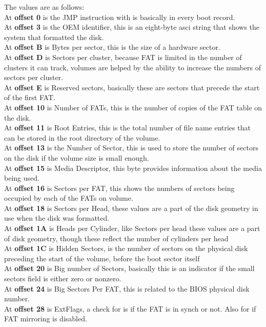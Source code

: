 \documentclass[12ptletterpaper]{paper}
\begin{document}
\begin{flushleft}
		
		The values are as follows:\\
		At \textbf{offset 0} is the JMP instruction with is basically in every boot record.\\
		At \textbf{offset 3} is the OEM identifier, this is an eight-byte asci string that shows the system that formatted the disk.\\
		At \textbf{offset B} is Bytes per sector, this is the size of a hardware sector.\\
		At \textbf{offset D} is Sectors per cluster, because FAT is limited in the number of clusters it can track, volumes are helped by the ability to increase the numbers of sectors per cluster.\\
		At \textbf{offset E} is Reserved sectors, basically these are sectors that precede the start of the first FAT.\\
		At \textbf{offset 10} is Number of FATs, this is the number of copies of the FAT table on the disk.\\
		At \textbf{offset 11} is Root Entries, this is the total number of file name entries that can be stored in the root directory of the volume.\\
		At \textbf{offset 13} is the Number of Sector, this is used to store the number of sectors on the disk if the volume size is small enough.\\
		At \textbf{offset 15} is Media Descriptor, this byte provides information about the media being used.\\
		At \textbf{offset 16} is Sectors per FAT, this shows the numbers of sectors being occupied by each of the FATs on volume. \\
		At \textbf{offset 18} is Sectors per Head, these values are a part of the disk geometry in use when the disk was formatted.\\
		At \textbf{offset 1A} is Heads per Cylinder, like Sectors per head these values are a part of disk geometry, though these reflect the number of cylinders per head\\
		At \textbf{offset 1C} is Hidden Sectors, is the number of sectors on the physical disk preceding the start of the volume, before the boot sector itself\\
		At \textbf{offset 20} is Big number of Sectors, basically this is an indicator if the small sectors field is either zero or nonzero.\\
		At \textbf{offset 24} is Big Sectors Per FAT, this is related to the BIOS physical disk number.\\
		At \textbf{offset 28} is ExtFlags, a check for is if the FAT is in synch or not. Also for if FAT mirroring is disabled.\\

\end{flushleft}
\end{document}
